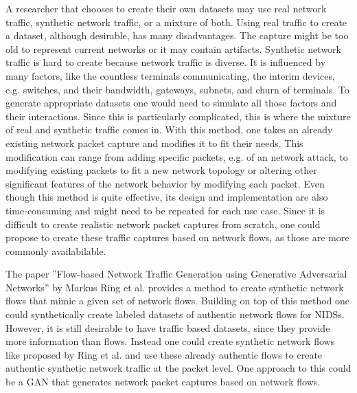 \documentclass[
	ngerman,
	ruledheaders=section,%
	class=report,%
	thesis={type=bachelor},%
	accentcolor=9c,%
	custommargins=true,%
	marginpar=false,%
	parskip=half-,%
	fontsize=11pt,%
]{tudapub}
\begin{document}
A researcher that chooses to create their own datasets may use real network traffic, synthetic network traffic, or a mixture of both.
Using real traffic to create a dataset, although desirable, has many disadvantages.
The capture might be too old to represent current networks or
it may contain artifacts.
Synthetic network traffic is hard to create because network traffic is diverse.
It is influenced by many factors, like
the countless terminals communicating,
the interim devices, e.g. switches, and their bandwidth,
gateways, subnets, and churn of terminals.
To generate appropriate datasets one would need to simulate all those factors and their interactions.
Since this is particularly complicated,
this is where the mixture of real and synthetic traffic comes in.
With this method, one takes an already existing network packet capture and modifies it to fit their needs.
This modification can range from adding specific packets, e.g. of an network attack\cite{corderoID2TDIYDataset2015},
to modifying existing packets to fit a new network topology
or altering other significant features of the network behavior by modifying each packet.
Even though this method is quite effective, its design and implementation are also time-consuming and might need to be repeated for each use case.
Since it is difficult to create realistic network packet captures from scratch,
one could propose to create these traffic captures based on network flows, as those are more commonly availabilable.

The paper ''Flow-based Network Traffic Generation using Generative Adversarial Networks'' by Markus Ring et al. \cite{ringFlowbasedNetworkTraffic2019a} provides a method to create synthetic network flows that mimic a given set of network flows.
Building on top of this method one could synthetically create labeled datasets of authentic network flows for NIDSs.
However, it is still desirable to have traffic based datasets, since they provide more information than flows.
Instead one could create synthetic network flows like proposed by Ring et al. \cite{ringFlowbasedNetworkTraffic2019a} and
use these already authentic flows to create authentic synthetic network traffic at the packet level.
One approach to this could be a GAN that generates network packet captures based on network flows.
\end{document}
